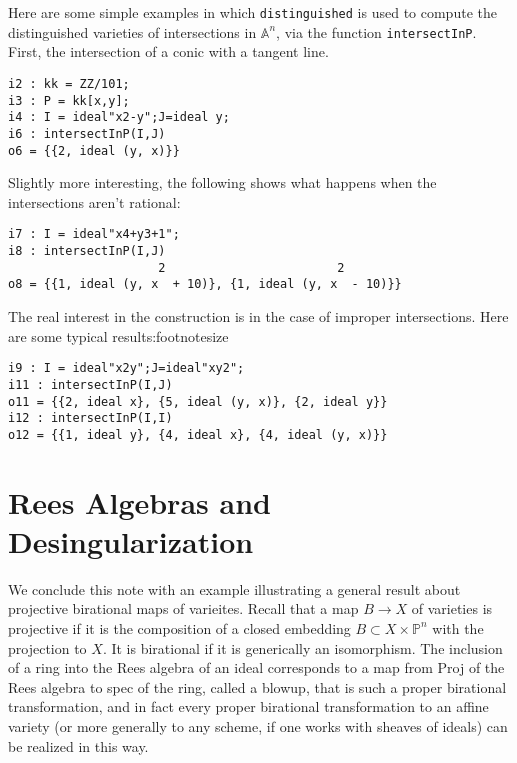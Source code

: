 \documentclass[twoside,12pt, leqno]{amsart}
\def\PP{{\mathbb P}}
\begin{document}
Here are some simple examples in which {\tt distinguished} is used to compute the distinguished varieties of
intersections in ${\mathbb A}^{n}$, via the function {\tt intersectInP}. First, the intersection of a conic with a tangent line.
\begin{footnotesize}
 \begin{verbatim}
i2 : kk = ZZ/101;
i3 : P = kk[x,y];
i4 : I = ideal"x2-y";J=ideal y;
i6 : intersectInP(I,J)
o6 = {{2, ideal (y, x)}}
\end{verbatim}
\end{footnotesize}
Slightly more interesting, the following shows what happens when the intersections aren't rational:
\begin{footnotesize}
 \begin{verbatim}
i7 : I = ideal"x4+y3+1";
i8 : intersectInP(I,J)
                     2                        2
o8 = {{1, ideal (y, x  + 10)}, {1, ideal (y, x  - 10)}}
\end{verbatim}
\end{footnotesize}
The real interest in the construction is in the case of improper intersections. Here are some typical results:{footnotesize}
\begin{footnotesize}
 \begin{verbatim}
i9 : I = ideal"x2y";J=ideal"xy2";
i11 : intersectInP(I,J)
o11 = {{2, ideal x}, {5, ideal (y, x)}, {2, ideal y}}
i12 : intersectInP(I,I)
o12 = {{1, ideal y}, {4, ideal x}, {4, ideal (y, x)}}
\end{verbatim}
\end{footnotesize}

\section{Rees Algebras and Desingularization}

We conclude this note with an example illustrating a general result about projective birational maps of varieites.
Recall that a map $B\to X$ of varieties is projective if it is the composition of a closed embedding $B\subset X\times \PP^n$ with the projection to $X$.
It is birational if it is generically an isomorphism. The inclusion of a ring into the Rees algebra
of an ideal corresponds to a map from Proj of the Rees algebra to spec of the ring, called a blowup, that is such a proper birational transformation, and in fact every proper birational transformation to an affine variety (or more generally to any scheme, if one works with sheaves of ideals) can be realized in this way.
\end{document}
